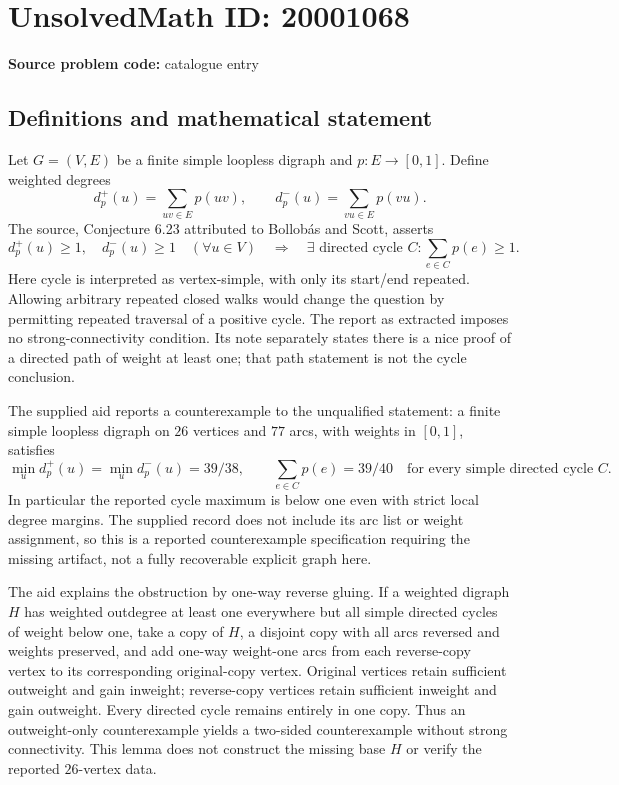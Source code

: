 \documentclass[11pt]{article}
\begin{document}
\section*{UnsolvedMath ID: 20001068}
\textbf{Source problem code:} catalogue entry
\subsection{Definitions and mathematical statement}
Let \(G=(V,E)\) be a finite simple loopless digraph and \(p:E\to[0,1]\). Define weighted degrees
\[
 d_p^+(u)=\sum_{uv\in E}p(uv),\qquad
 d_p^-(u)=\sum_{vu\in E}p(vu).
\]
The source, Conjecture 6.23 attributed to Bollob\'as and Scott, asserts
\[
 d_p^+(u)\ge1,\quad d_p^-(u)\ge1\quad(\forall u\in V)
 \quad\Longrightarrow\quad
 \exists\text{ directed cycle }C:\sum_{e\in C}p(e)\ge1.
\]
Here cycle is interpreted as vertex-simple, with only its start/end repeated. Allowing arbitrary repeated closed walks would change the question by permitting repeated traversal of a positive cycle. The report as extracted imposes no strong-connectivity condition. Its note separately states there is a nice proof of a directed path of weight at least one; that path statement is not the cycle conclusion.

The supplied aid reports a counterexample to the unqualified statement: a finite simple loopless digraph on \(26\) vertices and \(77\) arcs, with weights in \([0,1]\), satisfies
\[
 \min_u d_p^+(u)=\min_u d_p^-(u)=39/38,
 \qquad
 \sum_{e\in C}p(e)=39/40\quad\text{for every simple directed cycle }C.
\]
In particular the reported cycle maximum is below one even with strict local degree margins. The supplied record does not include its arc list or weight assignment, so this is a reported counterexample specification requiring the missing artifact, not a fully recoverable explicit graph here.

The aid explains the obstruction by one-way reverse gluing. If a weighted digraph \(H\) has weighted outdegree at least one everywhere but all simple directed cycles of weight below one, take a copy of \(H\), a disjoint copy with all arcs reversed and weights preserved, and add one-way weight-one arcs from each reverse-copy vertex to its corresponding original-copy vertex. Original vertices retain sufficient outweight and gain inweight; reverse-copy vertices retain sufficient inweight and gain outweight. Every directed cycle remains entirely in one copy. Thus an outweight-only counterexample yields a two-sided counterexample without strong connectivity. This lemma does not construct the missing base \(H\) or verify the reported \(26\)-vertex data.
\end{document}
